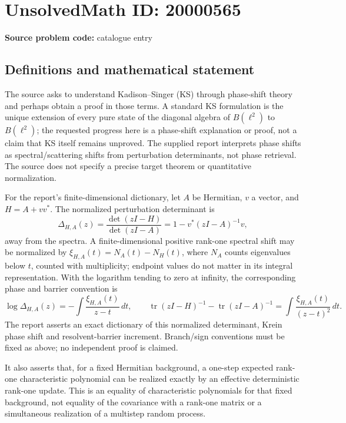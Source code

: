 \documentclass[11pt]{article}
\begin{document}
\section*{UnsolvedMath ID: 20000565}
\textbf{Source problem code:} catalogue entry
\subsection{Definitions and mathematical statement}
The source asks to understand Kadison--Singer (KS) through phase-shift theory and perhaps obtain a proof in those terms. A standard KS formulation is the unique extension of every pure state of the diagonal algebra of \(B(\ell^2)\) to \(B(\ell^2)\); the requested progress here is a phase-shift explanation or proof, not a claim that KS itself remains unproved. The supplied report interprets phase shifts as spectral/scattering shifts from perturbation determinants, not phase retrieval. The source does not specify a precise target theorem or quantitative normalization.

For the report's finite-dimensional dictionary, let \(A\) be Hermitian, \(v\) a vector, and \(H=A+vv^*\). The normalized perturbation determinant is
\[
 \Delta_{H,A}(z)=\frac{\det(zI-H)}{\det(zI-A)}
 =1-v^*(zI-A)^{-1}v,
\]
away from the spectra. A finite-dimensional positive rank-one spectral shift may be normalized by
\(\xi_{H,A}(t)=N_A(t)-N_H(t)\), where \(N_A\) counts eigenvalues below \(t\), counted with multiplicity; endpoint values do not matter in its integral representation. With the logarithm tending to zero at infinity, the corresponding phase and barrier convention is
\[
 \log\Delta_{H,A}(z)=-\int\frac{\xi_{H,A}(t)}{z-t}\,dt,\qquad
 \operatorname{tr}(zI-H)^{-1}-\operatorname{tr}(zI-A)^{-1}
 =\int\frac{\xi_{H,A}(t)}{(z-t)^2}\,dt.
\]
The report asserts an exact dictionary of this normalized determinant, Krein phase shift and resolvent-barrier increment. Branch/sign conventions must be fixed as above; no independent proof is claimed.

It also asserts that, for a fixed Hermitian background, a one-step expected rank-one characteristic polynomial can be realized exactly by an effective deterministic rank-one update. This is an equality of characteristic polynomials for that fixed background, not equality of the covariance with a rank-one matrix or a simultaneous realization of a multistep random process.
\end{document}

